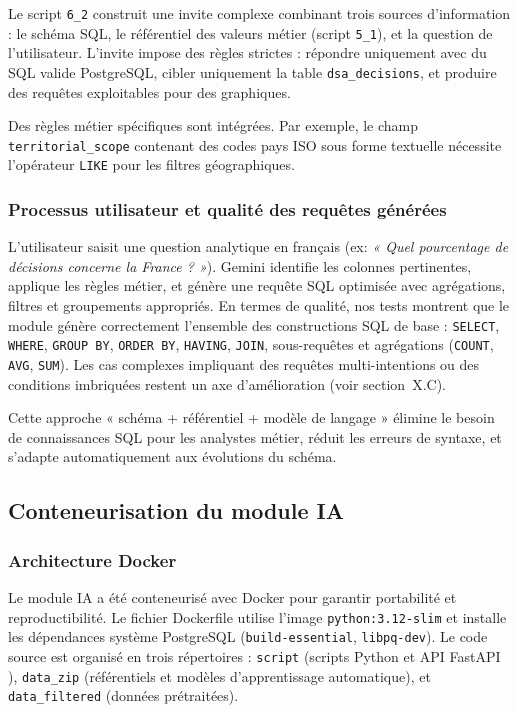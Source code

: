 \documentclass[10pt,twocolumn,a4paper]{article}
\begin{document}
Le script \texttt{6\_2} construit une invite complexe combinant trois sources d'information : le schéma SQL, le référentiel des valeurs métier (script \texttt{5\_1}), et la question de l'utilisateur. L'invite impose des règles strictes : répondre uniquement avec du SQL valide PostgreSQL, cibler uniquement la table \texttt{dsa\_decisions}, et produire des requêtes exploitables pour des graphiques.

Des règles métier spécifiques sont intégrées. Par exemple, le champ \texttt{territorial\_scope} contenant des codes pays ISO sous forme textuelle nécessite l'opérateur \texttt{LIKE} pour les filtres géographiques.

\subsubsection{Processus utilisateur et qualité des requêtes générées}

L'utilisateur saisit une question analytique en français (ex: \textit{« Quel pourcentage de décisions concerne la France ? »}). Gemini identifie les colonnes pertinentes, applique les règles métier, et génère une requête SQL optimisée avec agrégations, filtres et groupements appropriés. En termes de qualité, nos tests montrent que le module génère correctement l'ensemble des constructions SQL de base : \texttt{SELECT}, \texttt{WHERE}, \texttt{GROUP BY}, \texttt{ORDER BY}, \texttt{HAVING}, \texttt{JOIN}, sous-requêtes et agrégations (\texttt{COUNT}, \texttt{AVG}, \texttt{SUM}). Les cas complexes impliquant des requêtes multi-intentions ou des conditions imbriquées restent un axe d'amélioration (voir section~X.C).

Cette approche « schéma + référentiel + modèle de langage » élimine le besoin de connaissances SQL pour les analystes métier, réduit les erreurs de syntaxe, et s'adapte automatiquement aux évolutions du schéma.

\subsection{Conteneurisation du module IA}

\subsubsection{Architecture Docker}

Le module IA a été conteneurisé avec Docker \cite{docker} pour garantir portabilité et reproductibilité. Le fichier Dockerfile utilise l'image \texttt{python:3.12-slim} et installe les dépendances système PostgreSQL (\texttt{build-essential}, \texttt{libpq-dev}). Le code source est organisé en trois répertoires : \texttt{script} (scripts Python et API FastAPI \cite{fastapi}), \texttt{data\_zip} (référentiels et modèles d'apprentissage automatique), et \texttt{data\_filtered} (données prétraitées).
\end{document}

